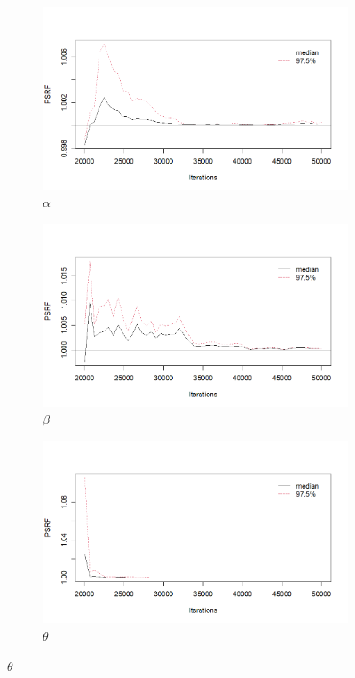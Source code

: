 \documentclass{Class/julia}
\begin{document}
\begin{figure}[!ht]
    \centering
    \begin{subfigure}{0.45\textwidth}
        \centering
        \includegraphics[width=\textwidth]{rytgaard1990/gelman_alpha.png}
        \caption{\( \alpha \)}
    \end{subfigure}
    \hfill
    \begin{subfigure}{0.45\textwidth}
        \centering
        \includegraphics[width=\textwidth]{rytgaard1990/gelman_beta.png}
        \caption{\( \beta \)}
    \end{subfigure}

    \vspace{1em}

    \begin{subfigure}{0.45\textwidth}
        \centering
        \includegraphics[width=\textwidth]{rytgaard1990/gelman_theta.png}
        \caption{\( \theta \)}
    \end{subfigure}


\end{figure}
\end{document}
